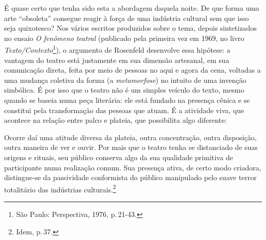 É quase certo que tenha sido esta a abordagem daquela noite. De que
forma uma arte “obsoleta” consegue reagir à força de uma indústria
cultural sem que isso seja quixotesco? Nos vários escritos produzidos
sobre o tema, depois sintetizados no ensaio {\it O fenômeno teatral}
(publicado pela primeira vez em 1969, no livro
{\it Texto/Contexto}\footnote{São Paulo: Perspectiva, 1976, p.\,21-43.}),
o argumento de Rosenfeld desenvolve essa hipótese: a vantagem do teatro
está justamente em sua dimensão artesanal, em sua comunicação direta,
feita por meio de pessoas no aqui e agora da cena, voltadas a uma
mudança coletiva da forma (a {\it metamorfose}) no intuito de uma
invenção simbólica. É por isso que o teatro não é um simples veículo do
texto, mesmo quando se baseia numa peça literária: ele está fundado na
presença cênica e se constitui pela transformação das pessoas que atuam.
É a atividade viva, que acontece na relação entre palco e plateia, que
possibilita algo diferente:

\startblockquote
Ocorre daí uma atitude diversa da plateia, outra concentração, outra
disposição, outra maneira de ver e ouvir. Por mais que o teatro tenha se
distanciado de suas origens e rituais, seu público conserva algo da sua
qualidade primitiva de participante numa realização comum. Sua presença
ativa, de certo modo criadora, distingue-se da passividade conformista
do público manipulado pelo suave terror totalitário das indústrias
culturais.\footnote{Idem, p.\,37.}
\stopblockquote


